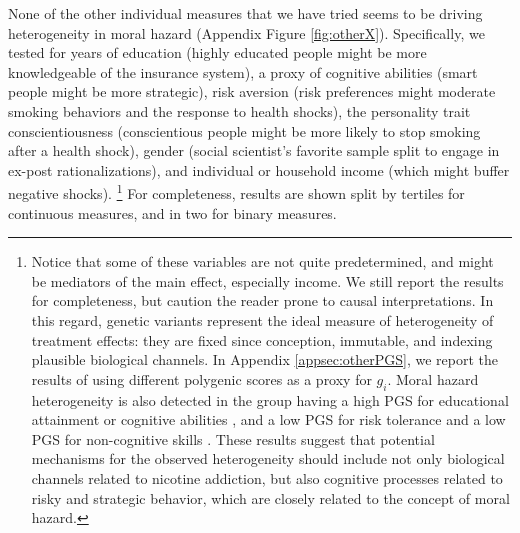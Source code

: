 \documentclass[11pt]{article}
\begin{document}
None of the other individual measures that we have tried seems to be driving heterogeneity in moral hazard (Appendix Figure \ref{fig:otherX}).
Specifically, we tested for years of education (highly educated people might be more knowledgeable of the insurance system), a proxy of cognitive abilities%
(smart people might be more strategic), risk aversion (risk preferences might moderate smoking behaviors and the response to health shocks), the personality trait conscientiousness (conscientious people might be more likely to stop smoking after a health shock), gender (social scientist's favorite sample split to engage in ex-post rationalizations), and individual or household income (which might buffer negative shocks).%
\footnote{Notice that some of these variables are not quite predetermined, and might be mediators of the main effect, especially income. We still report the results for completeness, but caution the reader prone to causal interpretations.
In this regard, genetic variants represent the ideal measure of heterogeneity of treatment effects: they are fixed since conception, immutable, and indexing plausible biological channels.
In Appendix \ref{appsec:otherPGS}, we report the results of using different polygenic scores as a proxy for $g_i$.
Moral hazard heterogeneity is also detected in the group having a high PGS for educational attainment or cognitive abilities \citep{Lee2018}, and a low PGS for risk tolerance \citep{KarlssonLinner2019} and a low PGS for non-cognitive skills \citep{Demange2020}.
These results suggest that potential mechanisms for the observed heterogeneity should include not only biological channels related to nicotine addiction, but also cognitive processes related to risky and strategic behavior, which are closely related to the concept of moral hazard.
} %
For completeness, results are shown split by tertiles for continuous measures, and in two for binary measures.
\end{document}
